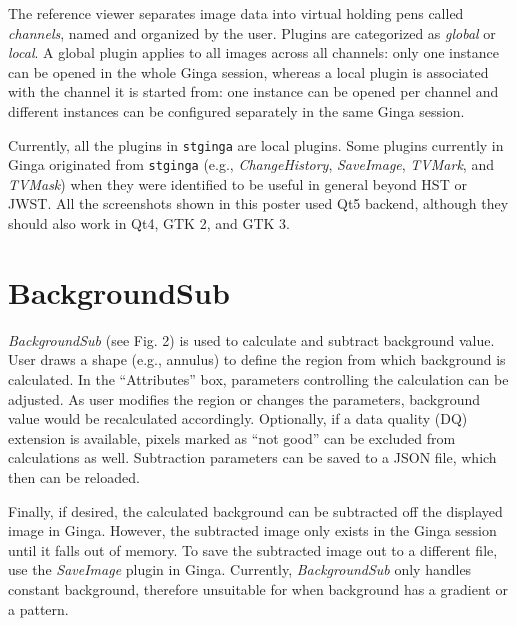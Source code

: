\documentclass[11pt,twoside]{article}
\begin{document}
The reference viewer separates image data into virtual holding pens
called \emph{channels}, named and organized by the user.
Plugins are categorized as \emph{global} or \emph{local}.  A global
plugin applies to all images across all channels: only one instance can
be opened in the whole Ginga session, whereas a local plugin is
associated with the channel it is started from: one instance can be
opened per channel and different instances can be configured separately
in the same Ginga session.

Currently, all the plugins in {\tt stginga} are local plugins.
Some plugins currently in Ginga originated from {\tt stginga}
(e.g., {\em ChangeHistory}, {\em SaveImage}, {\em TVMark}, and {\em TVMask})
when they were identified to be useful in general beyond HST or JWST.
All the screenshots shown in this poster used Qt5 backend, although they should
also work in Qt4, GTK 2, and GTK 3.

\section{BackgroundSub}


{\em BackgroundSub} (see Fig. 2) is used to calculate and subtract background
value. User draws a shape (e.g., annulus) to define
the region from which background is calculated. In the ``Attributes'' box,
parameters controlling the calculation can be adjusted.
As user modifies the region or changes the parameters, background value would
be recalculated accordingly.
Optionally, if a data quality (DQ) extension is available, pixels marked as
``not good'' can be excluded from calculations as well.
Subtraction parameters can be saved to a JSON file, which then can be reloaded.

Finally, if desired, the calculated background can be subtracted off
the displayed image in Ginga. However, the subtracted image only exists in the
Ginga session until it falls out of memory.
To save the subtracted image out to a different file, use the {\em SaveImage}
plugin in Ginga.
Currently, {\em BackgroundSub} only handles constant background, therefore
unsuitable for when background has a gradient or a pattern.
\end{document}
